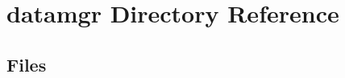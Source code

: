 \section{datamgr Directory Reference}
\label{dir_8fc6a8cc4633f75ec813f05b02c318af}
\subsection*{Files}
\begin{DoxyCompactItemize}
\end{DoxyCompactItemize}
